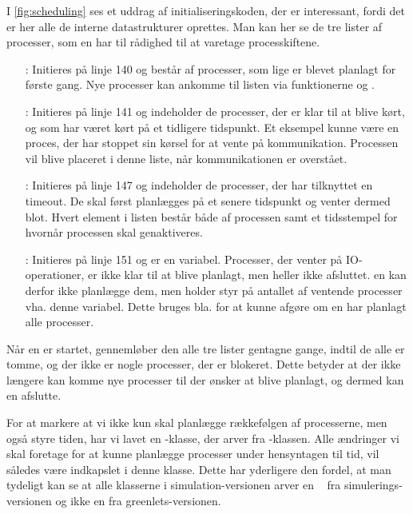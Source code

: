  I \cref{fig:scheduling} ses et uddrag af initialiseringskoden, der er interessant, fordi det er her alle de interne datastrukturer oprettes. Man kan her se de tre lister af processer, som \sched en har til rådighed til at varetage processkiftene. 
 \begin{itemize}
 \tightlist 
 \item[\code{new}:] Initieres på linje 140 og består af processer, som lige er blevet planlagt for første gang. Nye processer kan ankomme til listen  via funktionerne  og .
 \item[\code{next}:]Initieres på linje 141 og indeholder de processer, der er klar til at blive kørt, og som har været kørt på et tidligere tidspunkt. Et eksempel kunne være en proces, der har stoppet sin kørsel for at vente på kommunikation. Processen vil blive placeret i denne liste, når kommunikationen er overstået. 
 \item[\code{timers}:] Initieres på linje 147 og indeholder de processer, der har tilknyttet en timeout. De skal først planlægges på et senere tidspunkt og venter dermed blot. Hvert element i listen består både af processen samt et tidsstempel for hvornår processen skal genaktiveres. 
 \item[\code{blocking}:] Initieres på linje 151 og er en variabel. Processer, der venter på IO-operationer, er ikke klar til at blive planlagt, men heller ikke afsluttet. \Sched en kan derfor ikke planlægge dem, men holder styr på antallet af ventende processer vha. denne variabel. Dette bruges bla. for at kunne afgøre om \sched en har planlagt alle processer.
\end{itemize}

Når \sched en er startet, gennemløber den alle tre lister gentagne gange, indtil de alle er tomme, og der ikke er nogle processer, der er blokeret. Dette betyder at der ikke længere kan komme nye processer til der ønsker at blive planlagt, og dermed kan \sched en afslutte.

For at markere at vi ikke kun skal  planlægge rækkefølgen
af processerne, men også styre tiden, har vi lavet en
-klasse, der arver fra -klassen. Alle ændringer
vi skal foretage for at kunne planlægge processer under hensyntagen til tid, vil således være indkapslet i denne klasse. 
Dette har yderligere den fordel, at man tydeligt kan se at alle klasserne i simulation-versionen arver en \sched~ fra simulerings-versionen og
ikke en \sched \xspace fra greenlets-versionen.

